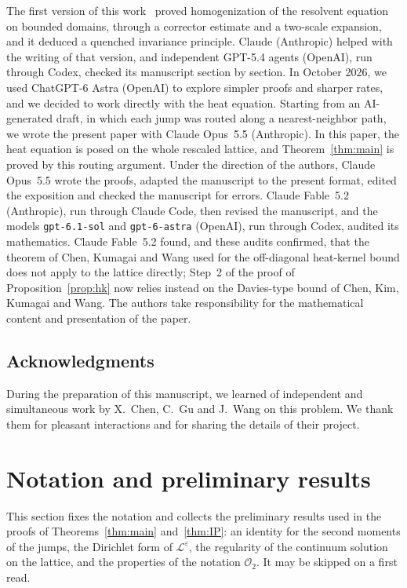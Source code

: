 \documentclass[11pt]{amsart}
\numberwithin{equation}{section}
\newcommand{\cO}{\mathcal{O}}
\newcommand{\Leps}{\mathcal{L}^\varepsilon}
\begin{document}
The first version of this work~\citep{BD2026} proved homogenization of the resolvent equation on bounded domains, through a corrector estimate and a two-scale expansion, and it deduced a quenched invariance principle.
Claude (Anthropic) helped with the writing of that version, and independent GPT-5.4 agents (OpenAI), run through Codex, checked its manuscript section by section.
In October 2026, we used ChatGPT-6 Astra (OpenAI) to explore simpler proofs and sharper rates, and we decided to work directly with the heat equation.
Starting from an AI-generated draft, in which each jump was routed along a nearest-neighbor path, we wrote the present paper with Claude Opus~5.5 (Anthropic).
In this paper, the heat equation is posed on the whole rescaled lattice, and Theorem~\ref{thm:main} is proved by this routing argument.
Under the direction of the authors, Claude Opus~5.5 wrote the proofs, adapted the manuscript to the present format, edited the exposition and checked the manuscript for errors.
Claude Fable~5.2 (Anthropic), run through Claude Code, then revised the manuscript, and the models \texttt{gpt-6.1-sol} and \texttt{gpt-6-astra} (OpenAI), run through Codex, audited its mathematics.
Claude Fable~5.2 found, and these audits confirmed, that the theorem of Chen, Kumagai and Wang used for the off-diagonal heat-kernel bound does not apply to the lattice directly; Step~2 of the proof of Proposition~\ref{prop:hk} now relies instead on the Davies-type bound of Chen, Kim, Kumagai and Wang.
The authors take responsibility for the mathematical content and presentation of the paper.

\subsection*{Acknowledgments}

During the preparation of this manuscript, we learned of independent and simultaneous work by X.~Chen, C.~Gu and J.~Wang on this problem.
We thank them for pleasant interactions and for sharing the details of their project.

\section{Notation and preliminary results} \label{sec:notation}

This section fixes the notation and collects the preliminary results used in the proofs of Theorems~\ref{thm:main} and~\ref{thm:IP}: an identity for the second moments of the jumps, the Dirichlet form of $\Leps$, the regularity of the continuum solution on the lattice, and the properties of the notation $\cO_2$.
It may be skipped on a first read.
\end{document}
